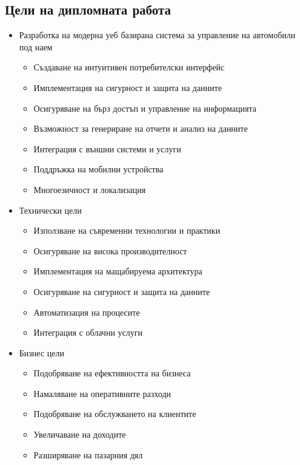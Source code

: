 \documentclass[12pt,a4paper]{article}
\begin{document}
\subsection{Цели на дипломната работа}
\begin{itemize}
    \item Разработка на модерна уеб базирана система за управление на автомобили под наем
    \begin{itemize}
        \item Създаване на интуитивен потребителски интерфейс
        \item Имплементация на сигурност и защита на данните
        \item Осигуряване на бърз достъп и управление на информацията
        \item Възможност за генериране на отчети и анализ на данните
        \item Интеграция с външни системи и услуги
        \item Поддръжка на мобилни устройства
        \item Многоезичност и локализация
    \end{itemize}
    
    \item Технически цели
    \begin{itemize}
        \item Използване на съвременни технологии и практики
        \item Осигуряване на висока производителност
        \item Имплементация на мащабируема архитектура
        \item Осигуряване на сигурност и защита на данните
        \item Автоматизация на процесите
        \item Интеграция с облачни услуги
    \end{itemize}
    
    \item Бизнес цели
    \begin{itemize}
        \item Подобряване на ефективността на бизнеса
        \item Намаляване на оперативните разходи
        \item Подобряване на обслужването на клиентите
        \item Увеличаване на доходите
        \item Разширяване на пазарния дял
    \end{itemize}
\end{itemize}
\end{document}
